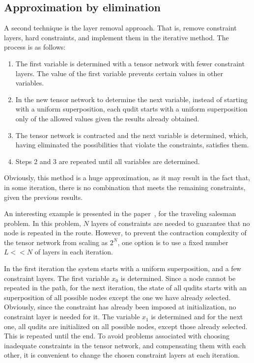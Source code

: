 \subsection{Approximation by elimination}
A second technique is the layer removal approach. That is, remove constraint layers, hard constraints, and implement them in the iterative method. The process is as follows:

\begin{enumerate}
    \item The first variable is determined with a tensor network with fewer constraint layers. The value of the first variable prevents certain values in other variables.
    \item In the new tensor network to determine the next variable, instead of starting with a uniform superposition, each qudit starts with a uniform superposition only of the allowed values given the results already obtained.
    \item The tensor network is contracted and the next variable is determined, which, having eliminated the possibilities that violate the constraints, satisfies them.
    \item Steps 2 and 3 are repeated until all variables are determined.
\end{enumerate}

Obviously, this method is a huge approximation, as it may result in the fact that, in some iteration, there is no combination that meets the remaining constraints, given the previous results.

An interesting example is presented in the paper~\cite{TSP_TN}, for the traveling salesman problem. In this problem, $N$ layers of constraints are needed to guarantee that no node is repeated in the route. However, to prevent the contraction complexity of the tensor network from scaling as $2^N$, one option is to use a fixed number $L<<N$ of layers in each iteration.

In the first iteration the system starts with a uniform superposition, and a few constraint layers. The first variable $x_0$ is determined. Since a node cannot be repeated in the path, for the next iteration, the state of all qudits starts with an superposition of all possible nodes except the one we have already selected. Obviously, since the constraint has already been imposed at initialization, no constraint layer is needed for it. The variable $x_1$ is determined and for the next one, all qudits are initialized on all possible nodes, except those already selected. This is repeated until the end. To avoid problems associated with choosing inadequate constraints in the tensor network, and compensating them with each other, it is convenient to change the chosen constraint layers at each iteration.

